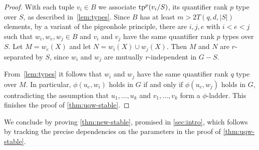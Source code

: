 \begin{proof}
%
%
%
With each tuple $v_i\in B$ we associate
$\mathrm{tp}^p(v_i/S)$, its
quantifier rank $p$ type over $S$, as described in~\cref{lem:types}.
Since $B$ has at least $m>2T(q,d,|S|)$ elements, by
a variant of the pigeonhole principle, there are $i,j,e$ 
with $i<e<j$ such that $ w_i,w_e,w_j\in B$ and $v_i$ and $v_j$ have the same quantifier rank $p$ types over $S$.
Let $M=w_e(X)$ and let $N=w_i(X)\cup w_j(X)$.
Then $M$ and $N$ are $r$-separated by $S$,
since $w_i$ and $w_j$ are
mutually $r$-independent in $G-S$.

From~\cref{lem:types} it follows that $w_i$ and $w_j$ have the same quantifier rank $q$ type over $M$.
In particular, $\phi(u_e, w_i)$ holds in $G$ if and only if 
$\phi(u_e, w_j)$ holds in $G$,
contradicting the assumption that $u_1,\ldots, u_k$ and $ v_1,\ldots, v_k$ form a $\phi$-ladder. This finishes the proof of \cref{thm:uqw-stable}.
\end{proof}





We conclude by proving \cref{thm:new-stable}, promised in \cref{sec:intro}, which follows by tracking the precise dependencies on the parameters in the proof of \cref{thm:uqw-stable}.

